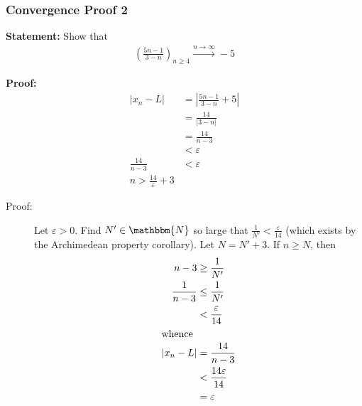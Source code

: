 \documentclass[10pt]{extarticle}
\newcommand{\N}{\mathbbm{N}}
\begin{document}
      \subsubsection{Convergence Proof 2}%
      \textbf{Statement:} Show that
      \begin{align*}
        \left(\frac{5n-1}{3-n}\right)_{n\geq 4} \xrightarrow{n\rightarrow\infty} -5
      \end{align*}

      \textbf{Proof:}
      \begin{align*}
        |x_n - L| &= \left|\frac{5n-1}{3-n} + 5\right|\\
                  &= \frac{14}{|3-n|}\\
                  &= \frac{14}{n-3}\\
                  &< \varepsilon\\
        \frac{14}{n-3} &< \varepsilon\\
        n > \frac{14}{\varepsilon} + 3
      \end{align*}
      \begin{description}
        \item[Proof:] Let $\varepsilon > 0$. Find $N' \in\N$ so large that $\frac{1}{N'} < \frac{\varepsilon}{14}$ (which exists by the Archimedean property corollary). Let $N = N' + 3$. If $n \geq N$, then
          \begin{align*}
            n-3 &\geq \frac{1}{N'}\\
            \frac{1}{n-3} &\leq \frac{1}{N'}\\
                          &< \frac{\varepsilon}{14}\\
                          \shortintertext{whence}
            |x_n - L| &= \frac{14}{n-3}\\
                      &< \frac{14\varepsilon}{14}\\
                      &= \varepsilon
          \end{align*}
      \end{description}
\end{document}
